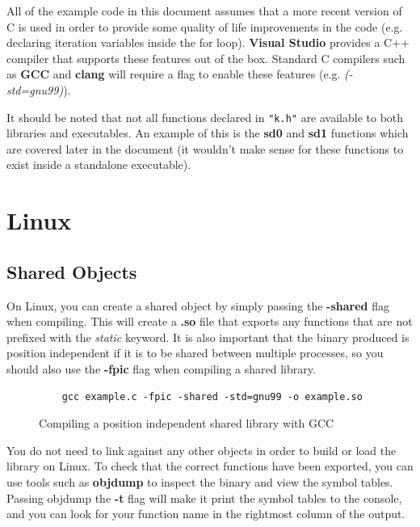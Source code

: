All of the example code in this document assumes that a more recent version of C is used in order to provide
some quality of life improvements in the code (e.g. declaring iteration variables inside the for loop). \textbf{Visual Studio} provides a C++ compiler that supports these features out of the box. Standard C
compilers such as \textbf{GCC} and \textbf{clang} will require a flag to enable these features 
(e.g. \textit{(-std=gnu99)}).

It should be noted that not all functions declared in \verb|"k.h"| are available to both libraries and
executables. An example of this is the \textbf{sd0} and \textbf{sd1} functions which are covered later
in the document (it wouldn't make sense for these functions to exist inside a standalone executable).

\section{Linux}

\subsection{Shared Objects}

On Linux, you can create a shared object by simply passing the \textbf{-shared} flag when compiling. This
will create a \textbf{.so} file that exports any functions that are not prefixed with the \textit{static}
keyword. It is also important that the binary produced is position independent if it is to be shared between
multiple processes, so you should also use the \textbf{-fpic} flag when compiling a shared library.

\begin{figure}[h]
	\begin{lstlisting}
	gcc example.c -fpic -shared -std=gnu99 -o example.so
	\end{lstlisting}
	\caption{Compiling a position independent shared library with GCC}
\end{figure}

You do not need to link against any other objects in order to build or load the library on Linux. To check
that the correct functions have been exported, you can use tools such as \textbf{objdump} to inspect the binary
and view the symbol tables. Passing objdump the \textbf{-t} flag will make it print the symbol tables to the console,
and you can look for your function name in the rightmost column of the output.

